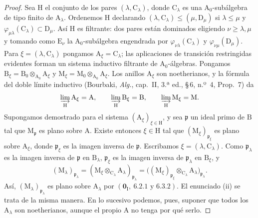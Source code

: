 \begin{proof}
Sea $\mathrm{H}$ el conjunto de los pares $(\lambda,\mathrm{C}_\lambda)$,
donde $\mathrm{C}_\lambda$ es una $\mathrm{A}_0$-subálgebra de tipo finito
de $\mathrm{A}_\lambda$. Ordenemos $\mathrm{H}$ declarando
$(\lambda,\mathrm{C}_\lambda)\leqslant
(\mu,\mathrm{D}_\mu)$ si $\lambda\leqslant\mu$ y
$\varphi_{\mu\lambda}(\mathrm{C}_\lambda)\subset\mathrm{D}_\mu$.
Así $\mathrm{H}$ es filtrante: dos pares están dominados eligiendo
$\nu\geqslant\lambda,\mu$ y tomando como $\mathrm{E}_\nu$ la
$\mathrm{A}_0$-subálgebra engendrada por
$\varphi_{\nu\lambda}(\mathrm{C}_\lambda)$ y
$\varphi_{\nu\mu}(\mathrm{D}_\mu)$. Para
$\xi=(\lambda,\mathrm{C}_\lambda)$ pongamos
$\mathrm{A}_\xi=\mathrm{C}_\lambda$; las aplicaciones de transición restringidas
evidentes forman un sistema inductivo filtrante de $\mathrm{A}_0$-álgebras.
Pongamos
$\mathrm{B}_\xi=\mathrm{B}_0\otimes_{\mathrm{A}_0}\mathrm{A}_\xi$
y
$\mathrm{M}_\xi=\mathrm{M}_0\otimes_{\mathrm{A}_0}\mathrm{A}_\xi$.
Los anillos $\mathrm{A}_\xi$ son noetherianos, y la fórmula del doble límite
inductivo (Bourbaki, \emph{Alg.}, cap.~II, 3.ª ed., \S\,6, n.º~4,
Prop.~7) da
\[
  \varinjlim_{\mathrm H}\mathrm{A}_\xi=\mathrm{A},\qquad
  \varinjlim_{\mathrm H}\mathrm{B}_\xi=\mathrm{B},\qquad
  \varinjlim_{\mathrm H}\mathrm{M}_\xi=\mathrm{M}.
\]
Supongamos demostrado  para el sistema
$(\mathrm{A}_\xi)_{\xi\in\mathrm H}$, y sea $\mathfrak p$ un ideal primo
de $\mathrm B$ tal que $\mathrm M_{\mathfrak p}$ es plano sobre
$\mathrm A$. Existe entonces $\xi\in\mathrm H$ tal que
$(\mathrm{M}_\xi)_{\mathfrak{p}_\xi}$ es plano sobre
$\mathrm{A}_\xi$, donde $\mathfrak p_\xi$ es la imagen inversa de
$\mathfrak p$. Escribamos $\xi=(\lambda,\mathrm{C}_\lambda)$. Como
$\mathfrak{p}_\lambda$ es la imagen inversa de $\mathfrak p$ en
$\mathrm{B}_\lambda$, $\mathfrak p_\xi$ es la imagen inversa de
$\mathfrak p_\lambda$ en $\mathrm B_\xi$, y
\[
  (\mathrm{M}_\lambda)_{\mathfrak p_\lambda}
  =(\mathrm{M}_\xi\otimes_{\mathrm{C}_\lambda}
    \mathrm{A}_\lambda)_{\mathfrak p_\lambda}
  =\bigl((\mathrm{M}_\xi)_{\mathfrak p_\xi}
    \otimes_{\mathrm{C}_\lambda}\mathrm{A}_\lambda
    \bigr)_{\mathfrak p_\lambda}.
\]
Así, $(\mathrm{M}_\lambda)_{\mathfrak p_\lambda}$ es plano sobre
$\mathrm{A}_\lambda$ por
$(\mathbf{0}_\mathrm{I},~6.2.1\text{ y }6.3.2)$. El enunciado (ii) se
trata de la misma manera. En lo sucesivo podemos, pues, suponer que todos los
$\mathrm{A}_\lambda$ son noetherianos, aunque el propio $\mathrm A$ no tenga
por qué serlo.


\end{proof}
